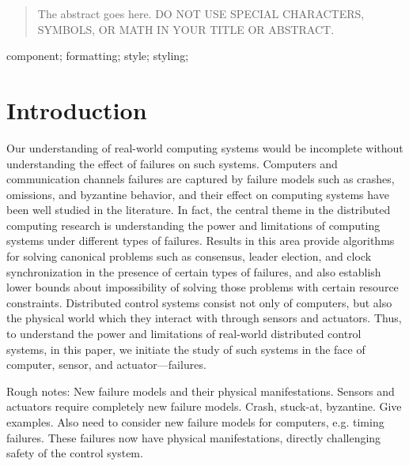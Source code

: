 \documentclass[10pt, conference, compsocconf]{IEEEtran}
\begin{document}
\maketitle


\begin{abstract}
The abstract goes here. DO NOT USE SPECIAL CHARACTERS, SYMBOLS, OR MATH IN YOUR TITLE OR ABSTRACT.

\end{abstract}

\begin{IEEEkeywords}
component; formatting; style; styling;

\end{IEEEkeywords}


\def\titleName{{Towards Fault Tolerant Distributed Real-time Control}}
\def\authorName{{Taylor Johnson}}


\section{Introduction}
\label{sec:intro}

%
Our understanding of real-world computing systems would be incomplete
without understanding the effect of failures on such systems.
Computers and communication channels failures are captured by failure models 
such as crashes, omissions, and byzantine behavior, and their effect on 
computing systems have been well studied in the literature. 
%
In fact, the central theme in the distributed computing research 
is understanding the power and limitations of computing systems under 
different types of failures. 
%
Results in this area provide algorithms
for solving canonical problems 
such as consensus, leader election, and clock synchronization
in the presence of certain types of failures, and also establish 
lower bounds about impossibility of solving those 
problems with certain resource constraints. 
%
Distributed control systems consist not only of computers, 
but also the physical world which they interact with through 
sensors and actuators. 
%
Thus, to understand the power and limitations of 
real-world distributed control systems, in this paper, we 
initiate the study of such systems in the face of computer, sensor, and actuator---failures. 

Rough notes:
New failure models and their physical manifestations.
Sensors and actuators require completely new failure models.
Crash, stuck-at, byzantine.
%
Give examples.
%
Also need to consider new failure models for computers, e.g.
timing failures. 
%
These failures now have physical manifestations, 
directly challenging safety of the control system.
\end{document}
